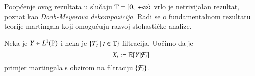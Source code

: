 \begin{nap} \label{nap:23.16}
    Poop\' cenje ovog rezultata u slu\v caju $\mathbb{T} = [ {0}, \: {+\infty} \rangle$ vrlo je netrivijalan rezultat, poznat kao \emph{Doob-Meyerova dekompozicija}.
    Radi se o fundamentalnom rezultatu teorije martingala koji omogu\' cuju razvoj stohasti\v cke analize.
\end{nap}

\begin{pr}  \label{pr:23.17}
    Neka je $Y \in L^1 (\mathbb{P})$ i neka je $\{{\mathcal{F}_t} \: | \: {t \in \mathbb{T}}\}$ filtracija.
    Uo\v cimo da je
    \begin{equation*}
        X_t := \mathbb{E} [Y | \mathcal{F}_t]
    \end{equation*}
    primjer martingala s obzirom na filtraciju $\{ \mathcal{F}_t \}$.
\end{pr}